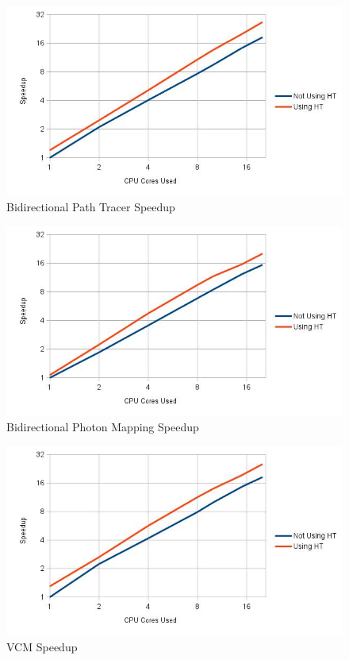 \begin{figure}[H]
\includegraphics[width=\linewidth]{img/bptSpeedup.jpg}
\caption{\label{img:bptSpeedup} Bidirectional Path Tracer Speedup}
\end{figure}

\begin{figure}[H]
\includegraphics[width=\linewidth]{img/bpmSpeedup.jpg}
\caption{\label{img:bpmSpeedup} Bidirectional Photon Mapping Speedup}
\end{figure}

\begin{figure}[H]
\includegraphics[width=\linewidth]{img/vcmSpeedup.jpg}
\caption{\label{img:vcmSpeedup} VCM Speedup}
\end{figure}

